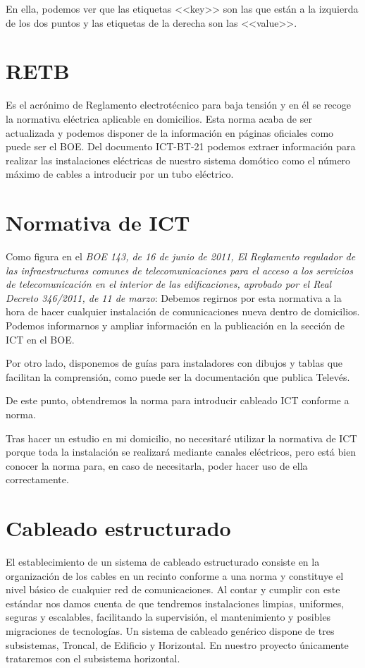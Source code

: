 En ella, podemos ver que las etiquetas <<key>> son las que están a la izquierda de los dos puntos y las etiquetas de la derecha son las <<value>>.

\section{RETB}
Es el acrónimo de Reglamento electrotécnico para baja tensión y en él se recoge la normativa eléctrica aplicable en domicilios.
Esta norma acaba de ser actualizada y podemos disponer de la información en páginas oficiales como puede ser el BOE\cite{manual:REBT}.
Del documento ICT-BT-21\cite{manual:ICT-BT-21} podemos extraer información para realizar las instalaciones eléctricas de nuestro sistema domótico como el número máximo de cables a introducir por un tubo eléctrico.

\section{Normativa de ICT}
Como figura en el \textit{BOE 143, de 16 de junio de 2011, El Reglamento regulador de las infraestructuras comunes de telecomunicaciones para el acceso a los servicios de telecomunicación en el interior de las edificaciones, aprobado por el Real Decreto 346/2011, de 11 de marzo}:
Debemos regirnos por esta normativa a la hora de hacer cualquier instalación de comunicaciones nueva dentro de domicilios.
Podemos informarnos y ampliar información en la publicación en la sección de ICT en el BOE\cite{manual:ICT}.

Por otro lado, disponemos de guías para instaladores con dibujos y tablas que facilitan la comprensión, como puede ser la documentación que publica Televés\cite{manual:ICT-Televes}.

De este punto, obtendremos la norma para introducir cableado ICT\cite{manual:ICT} conforme a norma.

Tras hacer un estudio en mi domicilio, no necesitaré utilizar la normativa de ICT\cite{manual:ICT} porque toda la instalación se realizará mediante canales eléctricos, pero está bien conocer la norma para, en caso de necesitarla, poder hacer uso de ella correctamente.

\section{Cableado estructurado}
El establecimiento de un sistema de cableado estructurado consiste en la organización de los cables en un recinto conforme a una norma y constituye el nivel básico de cualquier red de comunicaciones.
Al contar y cumplir con este estándar nos damos cuenta de que tendremos instalaciones limpias, uniformes, seguras y escalables, facilitando la supervisión, el mantenimiento y posibles migraciones de tecnologías.
Un sistema de cableado genérico dispone de tres subsistemas, Troncal, de Edificio y Horizontal. En nuestro proyecto únicamente trataremos con el subsistema horizontal.

